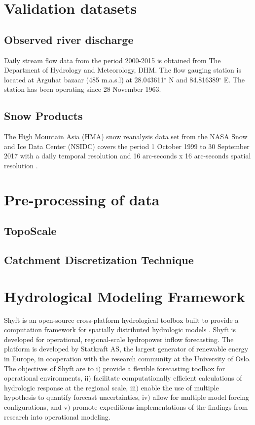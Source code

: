 \section{Validation datasets}

\subsection{Observed river discharge} 

Daily stream flow data from the period 2000-2015 is obtained from The Department of Hydrology and Meteorology, DHM. The  flow gauging station is located at Arguhat bazaar (485 m.a.s.l) at 28.043611$^{\circ}$ N and 84.816389$^{\circ}$ E. The station has been operating since 28 November 1963. 

\subsection{Snow Products}

The High Mountain Asia (HMA) snow reanalysis data set from the NASA Snow and Ice Data Center (NSIDC) covers the period 1 October 1999 to 30 September 2017 with a daily temporal resolution and 16 arc-seconds x 16 arc-seconds spatial resolution \autocite{margulisHighMountainAsia2021}. 


\section{Pre-processing of data}

\subsection{TopoScale}

\subsection{Catchment Discretization Technique}


\section{Hydrological Modeling Framework}


Shyft is an open-source cross-platform hydrological toolbox built to provide a computation framework for spatially distributed hydrologic models \autocite{burkhartShyftV4Framework2021}. Shyft is developed for operational, regional-scale hydropower inflow forecasting. The platform is developed by Statkraft AS, the largest generator of renewable energy in Europe, in cooperation with the research community at the University of Oslo. The objectives of Shyft are to i$)$ provide a flexible forecasting toolbox for operational environments, ii$)$ facilitate computationally efficient calculations of hydrologic response at the regional scale, iii$)$ enable the use of multiple hypothesis to quantify forecast uncertainties, iv$)$ allow for multiple model forcing configurations, and v$)$ promote expeditious implementations of the findings from research into operational modeling. 

